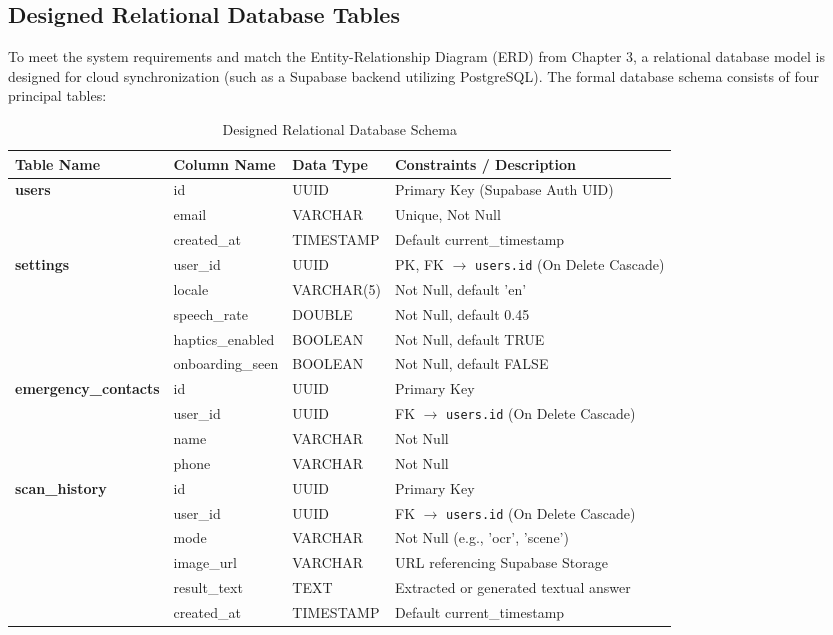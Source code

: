 \documentclass[12pt,a4paper]{report}
\begin{document}
\subsection{Designed Relational Database Tables}
To meet the system requirements and match the Entity-Relationship Diagram (ERD) from Chapter 3, a relational database model is designed for cloud synchronization (such as a Supabase backend utilizing PostgreSQL). The formal database schema consists of four principal tables:

\begin{table}[h]
\centering
\caption{Designed Relational Database Schema}
\begin{tabularx}{\textwidth}{|p{}|p{}|p{}|X|}
\hline
\textbf{Table Name} & \textbf{Column Name} & \textbf{Data Type} & \textbf{Constraints / Description} \\
\hline
\textbf{users} & id & UUID & Primary Key (Supabase Auth UID) \\
               & email & VARCHAR & Unique, Not Null \\
               & created\_at & TIMESTAMP & Default current\_timestamp \\
\hline
\textbf{settings} & user\_id & UUID & PK, FK $\rightarrow$ \texttt{users.id} (On Delete Cascade) \\
                  & locale & VARCHAR(5) & Not Null, default 'en' \\
                  & speech\_rate & DOUBLE & Not Null, default 0.45 \\
                  & haptics\_enabled & BOOLEAN & Not Null, default TRUE \\
                  & onboarding\_seen & BOOLEAN & Not Null, default FALSE \\
\hline
\textbf{emergency\_contacts} & id & UUID & Primary Key \\
                            & user\_id & UUID & FK $\rightarrow$ \texttt{users.id} (On Delete Cascade) \\
                            & name & VARCHAR & Not Null \\
                            & phone & VARCHAR & Not Null \\
\hline
\textbf{scan\_history} & id & UUID & Primary Key \\
                       & user\_id & UUID & FK $\rightarrow$ \texttt{users.id} (On Delete Cascade) \\
                       & mode & VARCHAR & Not Null (e.g., 'ocr', 'scene') \\
                       & image\_url & VARCHAR & URL referencing Supabase Storage \\
                       & result\_text & TEXT & Extracted or generated textual answer \\
                       & created\_at & TIMESTAMP & Default current\_timestamp \\
\hline
\end{tabularx}
\end{table}
\end{document}
